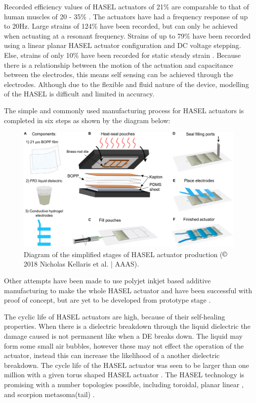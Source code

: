 Recorded efficiency values of HASEL actuators of 21\% are comparable to that of human muscles of 20 - 35\% \citep{Smith2005}. The actuators have had a frequency response of up to 20Hz. Large strains of 124\% have been recorded, but can only be achieved when actuating at a resonant frequency. Strains of up to 79\% have been recorded using a linear planar HASEL actuator configuration and DC voltage stepping.  Else, strains of only 10\% have been recorded for static steady strain \citep{Kellaris2018}.
Because there is a relationship between the motion of the actuation and capacitance between the electrodes, this means self sensing can be achieved through the electrodes. Although due to the flexible and fluid nature of the device, modelling of the HASEL is difficult and limited in accuracy.

The simple and commonly used manufacturing process for HASEL actuators is completed in six steps as shown by the diagram below:
\begin{figure}[H]
	\centering
	\includegraphics[width=0.7\linewidth]{Figures/HASEL_manuf.jpg}
	\caption{Diagram of the simplified stages of HASEL actuator production \citep{Kellaris2018} ($\copyright$ 2018 Nicholas Kellaris et al. | AAAS).}
	\label{fig:Artificial Muscle_HASEL_manf}
\end{figure}

Other attempts have been made to use polyjet inkjet based additive manufacturing to make the whole HASEL actuator and have been successful with proof of concept, but are yet to be developed from prototype stage \citep{Manionn.d.}. 

The cyclic life of HASEL actuators are high, because of their self-healing properties. When there is a dielectric breakdown through the liquid dielectric the damage caused is not permanent like when a DE breaks down. The liquid may form some small air bubbles, however these may not effect the operation of the actuator, instead this can increase the likelihood of a another dielectric breakdown. The cycle life of the HASEL actuator was seen to be larger than one million with a given torus shaped HASEL actuator \citep{Acome2018}. The HASEL technology is promising with a number topologies possible,  including toroidal, planar linear \citep{Acome2018}, and scorpion metasoma(tail) \citep{Mitchell2019}.


